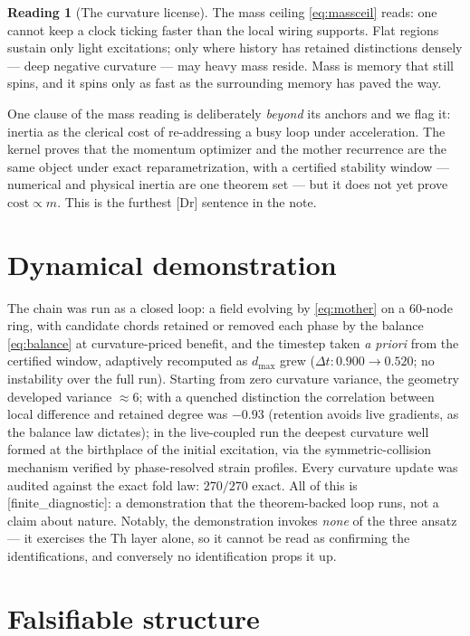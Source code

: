 \documentclass[10pt,twocolumn]{article}
\theoremstyle{definition}
\newtheorem{reading}{Reading}
\newcommand{\Dr}{\textsf{[Dr]}}
\begin{document}
\begin{reading}[The curvature license]
The mass ceiling \eqref{eq:massceil} reads: one cannot keep a clock ticking faster
than the local wiring supports. Flat regions sustain only light excitations; only
where history has retained distinctions densely --- deep negative curvature --- may
heavy mass reside. Mass is memory that still spins, and it spins only as fast as the
surrounding memory has paved the way.
\end{reading}

One clause of the mass reading is deliberately \emph{beyond} its anchors and we flag
it: inertia as the clerical cost of re-addressing a busy loop under acceleration. The
kernel proves that the momentum optimizer and the mother recurrence are the same
object under exact reparametrization, with a certified stability window --- numerical
and physical inertia are one theorem set --- but it does not yet prove
$\text{cost}\propto m$. This is the furthest \Dr{} sentence in the note.

\section{Dynamical demonstration}\label{sec:sim}

The chain was run as a closed loop: a field evolving by \eqref{eq:mother} on a
$60$-node ring, with candidate chords retained or removed each phase by the balance
\eqref{eq:balance} at curvature-priced benefit, and the timestep taken \emph{a priori}
from the certified window, adaptively recomputed as $d_{\max}$ grew
($\Delta t: 0.900\to 0.520$; no instability over the full run). Starting from zero
curvature variance, the geometry developed variance $\approx 6$; with a quenched
distinction the correlation between local difference and retained degree was $-0.93$
(retention avoids live gradients, as the balance law dictates); in the live-coupled
run the deepest curvature well formed at the birthplace of the initial excitation,
via the symmetric-collision mechanism verified by phase-resolved strain profiles.
Every curvature update was audited against the exact fold law: $270/270$ exact.
All of this is \textsf{[finite\_diagnostic]}: a demonstration that the theorem-backed
loop runs, not a claim about nature. Notably, the demonstration invokes \emph{none} of
the three ansatz --- it exercises the Th layer alone, so it cannot be read as
confirming the identifications, and conversely no identification props it up.

\section{Falsifiable structure}\label{sec:falsify}
\end{document}
